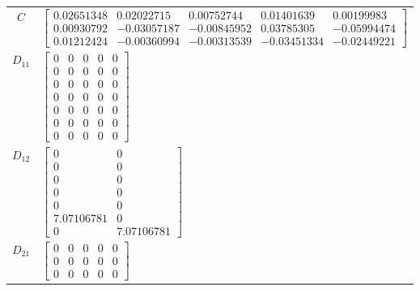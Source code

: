 \begin{tabular}{cl}
   $C$    & $\left[\begin{matrix}0.02651348 & 0.02022715 & 0.00752744 & 0.01401639 & 0.00199983\\0.00930792 & -0.03057187 & -0.00845952 & 0.03785305 & -0.05994474\\0.01212424 & -0.00360994 & -0.00313539 & -0.03451334 & -0.02449221\end{matrix}\right]$                                                                                                                                                         \\
 $D_{11}$ & $\left[\begin{matrix}0 & 0 & 0 & 0 & 0\\0 & 0 & 0 & 0 & 0\\0 & 0 & 0 & 0 & 0\\0 & 0 & 0 & 0 & 0\\0 & 0 & 0 & 0 & 0\\0 & 0 & 0 & 0 & 0\\0 & 0 & 0 & 0 & 0\end{matrix}\right]$                                                                                                                                                                                                                           \\
 $D_{12}$ & $\left[\begin{matrix}0 & 0\\0 & 0\\0 & 0\\0 & 0\\0 & 0\\7.07106781 & 0\\0 & 7.07106781\end{matrix}\right]$                                                                                                                                                                                                                                                                                             \\
 $D_{21}$ & $\left[\begin{matrix}0 & 0 & 0 & 0 & 0\\0 & 0 & 0 & 0 & 0\\0 & 0 & 0 & 0 & 0\end{matrix}\right]$                                                                                                                                                                                                                                                                                                       \\
\hline
\end{tabular}